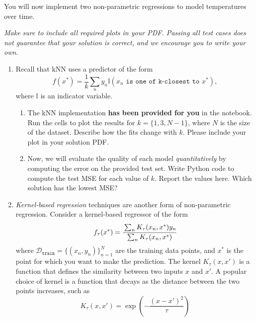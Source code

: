 \documentclass[submit]{../harvardml}
\begin{document}
\begin{problem}

You will now implement two non-parametric regressions to model temperatures over time.

\vspace{0.5cm}
\noindent\emph{Make sure to include all required plots in your PDF. Passing all test cases does not guarantee that your solution is correct, and we encourage you to write your own. }

\begin{enumerate}
\item
 Recall that kNN uses a predictor of the form
\[
  f(x^*) = \frac{1}{k} \sum_n y_n \mathbb{I}(x_n \texttt{ is one of k-closest to } x^*),
\]
where $\mathbb{I}$ is an indicator variable.
\begin{enumerate}

  \item The kNN implementation \textbf{has been provided for you} in the notebook. Run the cells to plot the results for $k=\{1, 3, N-1\}$, where $N$ is the size of the dataset. Describe how the fits change with $k$. Please include your plot in your solution PDF.

  \item Now, we will evaluate the quality of each model \emph{quantitatively} by computing the error on the provided test set. Write Python code to compute the test MSE for each value of $k$.  Report the values here. Which solution has the lowest MSE?

\end{enumerate}

\item \textit{Kernel-based regression} techniques are another form of non-parametric regression. Consider a kernel-based
regressor of the form
\begin{equation*}
  f_\tau(x^*) = \cfrac{\sum_{n} K_\tau(x_n,x^*) y_n}{\sum_n K_\tau(x_n, x^*)}
\end{equation*}
where $\mathcal{D}_\texttt{train} = \{(x_n,y_n)\}_{n = 1} ^N$ are the
training data points, and $x^*$ is the point for which you want to
make the prediction.  The kernel $K_\tau(x,x')$ is a function that
defines the similarity between two inputs $x$ and $x'$. A popular
choice of kernel is a function that decays as the distance between the
two points increases, such as
\begin{equation*}
  K_\tau(x,x') = \exp\left(-\frac{(x-x')^2}{\tau}\right)
\end{equation*}


\end{enumerate}
\end{problem}
\end{document}
